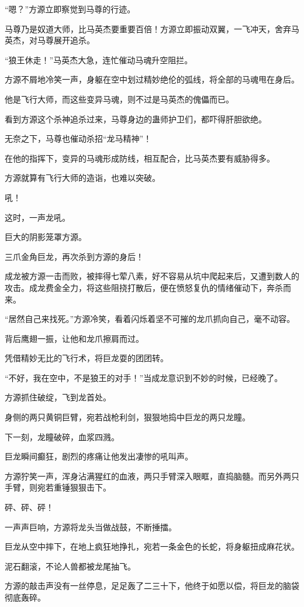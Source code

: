 \begin{this_body}
“嗯？”方源立即察觉到马尊的行迹。

马尊乃是奴道大师，比马英杰要重要百倍！方源立即振动双翼，一飞冲天，舍弃马英杰，对马尊展开追杀。

“狼王休走！”马英杰大急，连忙催动马魂升空阻拦。

方源不屑地冷笑一声，身躯在空中划过精妙绝伦的弧线，将全部的马魂甩在身后。

他是飞行大师，而这些变异马魂，则不过是马英杰的傀儡而已。

看到方源这个杀神追杀过来，马尊身边的蛊师护卫们，都吓得肝胆欲绝。

无奈之下，马尊也催动杀招“龙马精神”！

在他的指挥下，变异的马魂形成防线，相互配合，比马英杰要有威胁得多。

方源就算有飞行大师的造诣，也难以突破。

吼！

这时，一声龙吼。

巨大的阴影笼罩方源。

三爪金角巨龙，再次杀到方源的身后！

成龙被方源一击而败，被摔得七荤八素，好不容易从坑中爬起来后，又遭到数人的攻击。成龙费金全力，将这些阻挠打散后，便在愤怒复仇的情绪催动下，奔杀而来。

“居然自己来找死。”方源冷笑，看着闪烁着坚不可摧的龙爪抓向自己，毫不动容。

背后鹰翅一振，让他和龙爪擦肩而过。

凭借精妙无比的飞行术，将巨龙耍的团团转。

“不好，我在空中，不是狼王的对手！”当成龙意识到不妙的时候，已经晚了。

方源抓住破绽，飞到龙首处。

身侧的两只黄铜巨臂，宛若战枪利剑，狠狠地捣中巨龙的两只龙瞳。

下一刻，龙瞳破碎，血浆四溅。

巨龙瞬间癫狂，剧烈的疼痛让他发出凄惨的吼叫声。

方源狞笑一声，浑身沾满猩红的血液，两只手臂深入眼眶，直捣脑髓。而另外两只手臂，则宛若重锤狠狠击下。

砰、砰、砰！

一声声巨响，方源将龙头当做战鼓，不断捶擂。

巨龙从空中摔下，在地上疯狂地挣扎，宛若一条金色的长蛇，将身躯扭成麻花状。

泥石翻滚，不论人兽都被龙尾抽飞。

方源的敲击声没有一丝停息，足足轰了二三十下，他终于如愿以偿，将巨龙的脑袋彻底轰碎。


\end{this_body}
